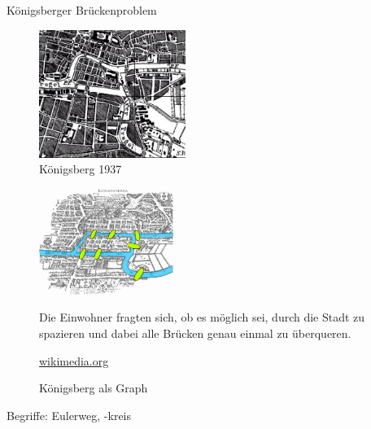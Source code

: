 \documentclass[18pt]{beamer}
\begin{document}
    \begin{frame}[allowframebreaks]{Königsberger Brückenproblem}
        \begin{figure}
            \centering
            \includegraphics[keepaspectratio,width=180px]{figures/Konigsberg_Brucken_BKG.png}
            \caption{Königsberg 1937 \cite{bkg_kon}}
        \end{figure}

        \framebreak

        \begin{figure}
            \centering
            \includegraphics[keepaspectratio,height=130px]{figures/Konigsberg_bridges.png}
            \caption{\tiny \url{wikimedia.org}}
            \glqq Die Einwohner fragten sich, ob es möglich sei, durch die Stadt zu spazieren und dabei alle Brücken genau einmal zu überqueren.\grqq
        \end{figure}
    \end{frame}

    \begin{frame}{}
        \begin{figure}[]
            \centering
            \caption{Königsberg als Graph}
        \end{figure}  

        \pause
        Begriffe: Eulerweg, -kreis
    \end{frame}
\end{document}

